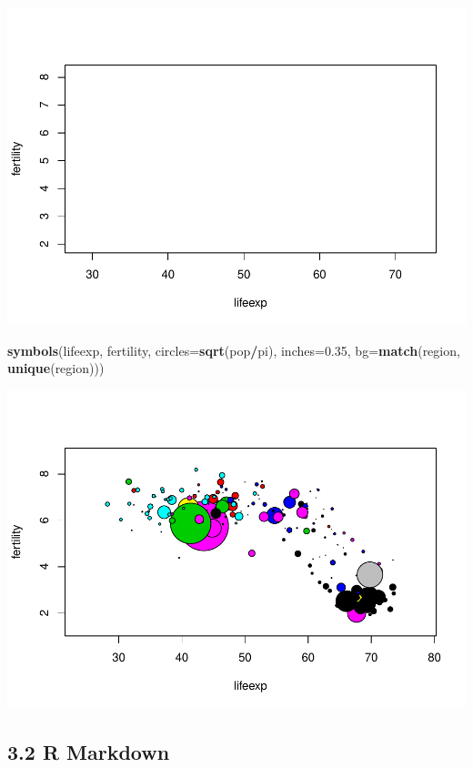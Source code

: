 \documentclass[]{article}
\newenvironment{Shaded}{\begin{snugshade}}{\end{snugshade}}
\newcommand{\KeywordTok}[1]{\textcolor[rgb]{0.13,0.29,0.53}{\textbf{#1}}}
\newcommand{\DataTypeTok}[1]{\textcolor[rgb]{0.13,0.29,0.53}{#1}}
\newcommand{\FloatTok}[1]{\textcolor[rgb]{0.00,0.00,0.81}{#1}}
\newcommand{\OperatorTok}[1]{\textcolor[rgb]{0.81,0.36,0.00}{\textbf{#1}}}
\newcommand{\NormalTok}[1]{#1}
\begin{document}
\includegraphics{stt-301-programming_files/figure-latex/unnamed-chunk-4-1.pdf}

\begin{Shaded}
\begin{Highlighting}[]
\KeywordTok{symbols}\NormalTok{(lifeexp, fertility, }\DataTypeTok{circles=}\KeywordTok{sqrt}\NormalTok{(pop}\OperatorTok{/}\NormalTok{pi), }\DataTypeTok{inches=}\FloatTok{0.35}\NormalTok{, }\DataTypeTok{bg=}\KeywordTok{match}\NormalTok{(region, }\KeywordTok{unique}\NormalTok{(region)))}
\end{Highlighting}
\end{Shaded}

\includegraphics{stt-301-programming_files/figure-latex/unnamed-chunk-4-2.pdf}

\subsection{3.2 R Markdown}\label{r-markdown}
\end{document}
